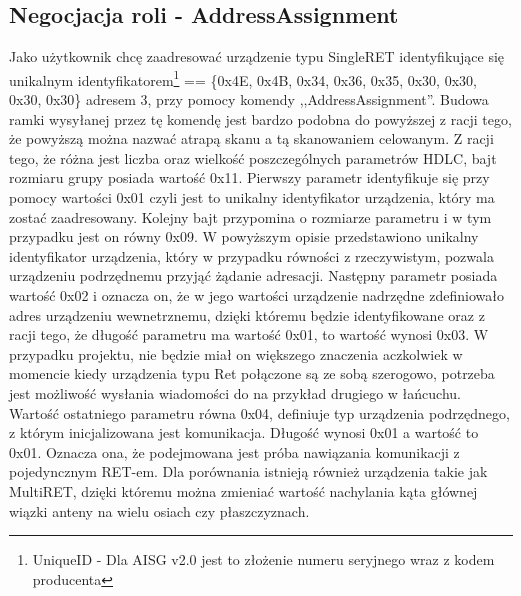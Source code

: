 		\subsection{Negocjacja roli - AddressAssignment}
			Jako użytkownik chcę zaadresować urządzenie typu SingleRET identyfikujące się unikalnym identyfikatorem\footnote{\label{UniqueID} UniqueID - Dla AISG v2.0 jest to złożenie numeru seryjnego wraz z kodem producenta} == \{0x4E, 0x4B, 0x34, 0x36, 0x35, 0x30, 0x30, 0x30, 0x30\} adresem 3, 
			przy pomocy komendy ,,AddressAssignment''.
			\newline\newline
			Budowa ramki wysyłanej przez tę komendę jest bardzo podobna do powyższej z racji tego, że powyższą można nazwać atrapą skanu a tą skanowaniem celowanym.
			Z racji tego, że różna jest liczba oraz wielkość poszczególnych parametrów HDLC, bajt rozmiaru grupy posiada wartość 0x11.
			\newline
			Pierwszy parametr identyfikuje się przy pomocy wartości 0x01 czyli jest to unikalny identyfikator urządzenia, który ma zostać zaadresowany.
			Kolejny bajt przypomina o rozmiarze parametru i w tym przypadku jest on równy 0x09. W powyższym opisie przedstawiono unikalny identyfikator urządzenia, który w przypadku
			równości z rzeczywistym, pozwala urządzeniu podrzędnemu przyjąć żądanie adresacji.
			\newline
			Następny parametr posiada wartość 0x02 i oznacza on, że w jego wartości urządzenie nadrzędne zdefiniowało adres urządzeniu wewnetrznemu, dzięki któremu
			będzie identyfikowane oraz z racji tego, że długość parametru ma wartość 0x01, to wartość wynosi 0x03. W przypadku projektu, nie będzie miał on większego znaczenia
			aczkolwiek w momencie kiedy urządzenia typu Ret połączone są ze sobą szerogowo, potrzeba jest możliwość wysłania wiadomości do na przykład drugiego w łańcuchu.
			\newline
			Wartość ostatniego parametru równa 0x04, definiuje typ urządzenia podrzędnego, z którym inicjalizowana jest komunikacja. Długość wynosi 0x01 a wartość to 0x01.
			Oznacza ona, że podejmowana jest próba nawiązania komunikacji z pojedyncznym RET-em.
			Dla porównania istnieją również urządzenia takie jak MultiRET, dzięki któremu można zmieniać wartość nachylania kąta głównej wiązki anteny na wielu osiach czy płaszczyznach.

